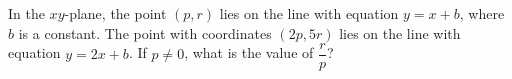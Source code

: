 In the $xy$-plane, the point $(p,r)$ lies on the line with equation $y=x+b$, where $b$ is a constant. The point with coordinates $(2p,5r)$ lies on the line with equation $y=2x+b$. If $p\ne0$, what is the value of $\dfrac rp$?
